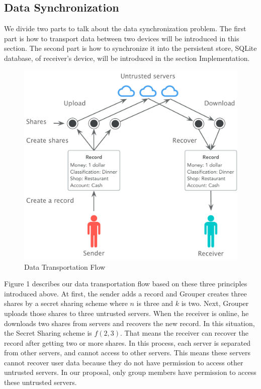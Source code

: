 \documentclass[twocolumn,10pt]{article}
\begin{document}
\subsection{Data Synchronization}

We divide two parts to talk about the data synchronization problem. The first part is how to transport data between two devices will be introduced in this section. The second part is how to synchronize it into the persistent store, SQLite database, of receiver’s device, will be introduced in the section Implementation.

\begin{figure}[!htb]
	\centering
	\includegraphics[scale=0.38]{sync_flow}
	\caption{Data Transportation Flow}
\end{figure}

Figure 1 describes our data transportation flow based on these three principles introduced above. At first, the sender adds a record and Grouper creates three shares by a secret sharing scheme where $n$ is three and $k$ is two. Next, Grouper uploads those shares to three untrusted servers. When the receiver is online, he downloads two shares from servers and recovers the new record. In this situation, the Secret Sharing scheme is ${f(2, 3)}$. That means the receiver can recover the record after getting two or more shares. In this process, each server is separated from other servers, and cannot access to other servers. This means these servers cannot recover user data because they do not have permission to access other untrusted servers. In our proposal, only group members have permission to access these untrusted servers.
\end{document}
